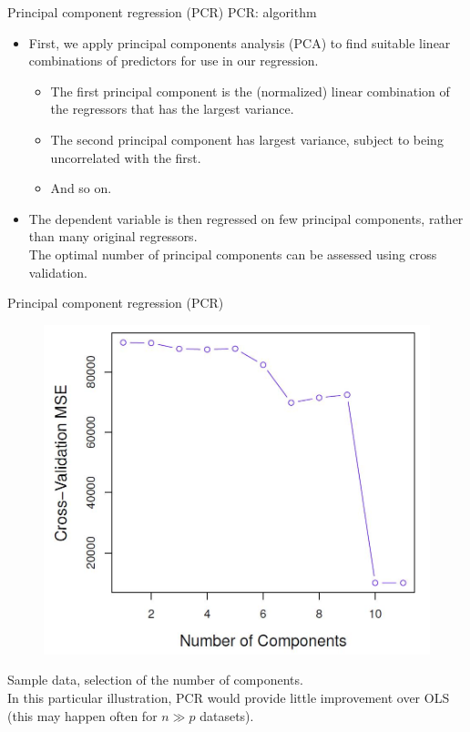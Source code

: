 \documentclass{beamer}
\begin{document}
\begin{frame}{Principal component regression (PCR)}
PCR: algorithm
\begin{itemize}
\medskip
\item First, we apply principal components analysis (PCA) to find suitable linear combinations of predictors for use in our regression.
\medskip
\begin{itemize}
    \item The first principal component is the (normalized) linear
combination of the regressors that has the largest variance.
\medskip 
\item The second principal component has largest variance,
subject to being uncorrelated with the first.
\medskip
\item And so on. 
\end{itemize}
\medskip
\item The dependent variable is then regressed on few principal components, rather than many original regressors.\\ \medskip
The optimal number of principal components can be assessed using cross validation.
\end{itemize}
\bigskip
\end{frame}
\begin{frame}{Principal component regression (PCR)}
\vspace{-0.7cm}
\begin{figure}
\includegraphics[scale=0.30]{IMG/PCRcomponent.jpg}
\end{figure}
\vspace{-0.5cm}
\centering Sample data, selection of the number of components. \\In this particular illustration, PCR would provide little improvement over OLS (this may happen often for $n\gg p$ datasets). 
\end{frame}
\end{document}
